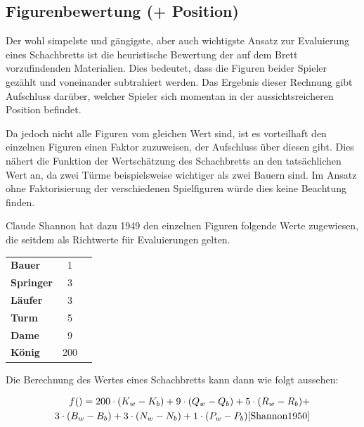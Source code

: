 
\subsection{Figurenbewertung (+ Position)}\label{material_evaluation}

Der wohl simpelste und gängigste, aber auch wichtigste Ansatz zur Evaluierung eines Schachbretts ist die heuristische Bewertung der auf dem Brett vorzufindenden Materialien. Dies bedeutet, dass die Figuren beider Spieler gezählt und voneinander subtrahiert werden. Das Ergebnis dieser Rechnung gibt Aufschluss darüber, welcher Spieler sich momentan in der aussichtsreicheren Position befindet.

Da jedoch nicht alle Figuren vom gleichen Wert sind, ist es vorteilhaft den einzelnen Figuren einen Faktor zuzuweisen, der Aufschluss über diesen gibt. Dies nähert die Funktion der Wertschätzung des Schachbretts an den tatsächlichen Wert an, da zwei Türme beispielsweise wichtiger als zwei Bauern sind. Im Ansatz ohne Faktorisierung der verschiedenen Spielfiguren würde dies keine Beachtung finden.

Claude Shannon hat dazu 1949 den einzelnen Figuren folgende Werte zugewiesen, die seitdem als Richtwerte für Evaluierungen gelten. \cite{Shannon1950}

\begin{center}
\begin{tabular}{ l c r }
\textbf{Bauer} & 1\\
\textbf{Springer} & 3 \\
\textbf{Läufer} & 3 \\
\textbf{Turm} & 5 \\
\textbf{Dame} & 9 \\
\textbf{König} & 200
\end{tabular}
\end{center}

Die Berechnung des Wertes eines Schachbretts kann dann wie folgt aussehen:

\begin{equation}
\begin{aligned}
f() = 200 \cdot (K_w-K_b) + 9 \cdot (Q_w-Q_b) + 5 \cdot (R_w-R_b) + \\3 \cdot (B_w-B_b) + 3 \cdot (N_w-N_b) + 1 \cdot (P_w-P_b) \cite{Shannon1950}
\end{aligned}
\end{equation}

